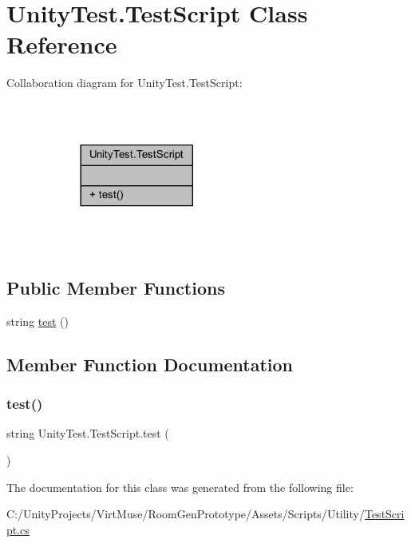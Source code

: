 \hypertarget{class_unity_test_1_1_test_script}{}\section{Unity\+Test.\+Test\+Script Class Reference}
\label{class_unity_test_1_1_test_script}


Collaboration diagram for Unity\+Test.\+Test\+Script\+:
\nopagebreak
\begin{figure}[H]
\begin{center}
\leavevmode
\includegraphics[width=185pt]{class_unity_test_1_1_test_script__coll__graph}
\end{center}
\end{figure}
\subsection*{Public Member Functions}
\begin{DoxyCompactItemize}
\item 
string \mbox{\hyperlink{class_unity_test_1_1_test_script_afb9f90dec348d29f5cea41ac78153e3a}{test}} ()
\end{DoxyCompactItemize}


\subsection{Member Function Documentation}
\mbox{\label{class_unity_test_1_1_test_script_afb9f90dec348d29f5cea41ac78153e3a}} 
\subsubsection{\texorpdfstring{test()}{test()}}
{\footnotesize\ttfamily string Unity\+Test.\+Test\+Script.\+test (\begin{DoxyParamCaption}{ }\end{DoxyParamCaption})}



The documentation for this class was generated from the following file\+:\begin{DoxyCompactItemize}
\item 
C\+:/\+Unity\+Projects/\+Virt\+Muse/\+Room\+Gen\+Prototype/\+Assets/\+Scripts/\+Utility/\mbox{\hyperlink{_test_script_8cs}{Test\+Script.\+cs}}\end{DoxyCompactItemize}
